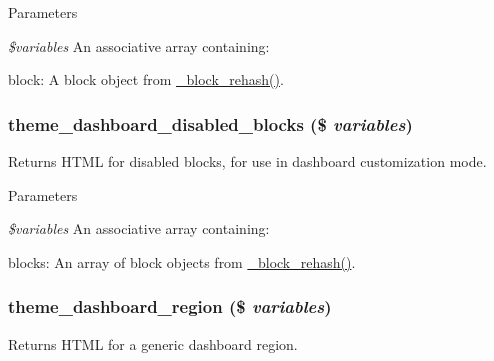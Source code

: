 \begin{DoxyParams}{Parameters}
\item[{\em \$variables}]An associative array containing:
\begin{DoxyItemize}
\item block: A block object from \hyperlink{block_8module_aa42865f9782787a854c27877cb850dbc}{\_\-block\_\-rehash()}. 
\end{DoxyItemize}\end{DoxyParams}
\hypertarget{group__themeable_ga8ac4d0963e51b469850301e4c1e85cb6}{
\subsubsection[{theme\_\-dashboard\_\-disabled\_\-blocks}]{\setlength{\rightskip}{0pt plus 5cm}theme\_\-dashboard\_\-disabled\_\-blocks (\$ {\em variables})}}
\label{group__themeable_ga8ac4d0963e51b469850301e4c1e85cb6}
Returns HTML for disabled blocks, for use in dashboard customization mode.


\begin{DoxyParams}{Parameters}
\item[{\em \$variables}]An associative array containing:
\begin{DoxyItemize}
\item blocks: An array of block objects from \hyperlink{block_8module_aa42865f9782787a854c27877cb850dbc}{\_\-block\_\-rehash()}. 
\end{DoxyItemize}\end{DoxyParams}
\hypertarget{group__themeable_ga2f5b5b4f1677e2768387c88b6532164c}{
\subsubsection[{theme\_\-dashboard\_\-region}]{\setlength{\rightskip}{0pt plus 5cm}theme\_\-dashboard\_\-region (\$ {\em variables})}}
\label{group__themeable_ga2f5b5b4f1677e2768387c88b6532164c}
Returns HTML for a generic dashboard region.


